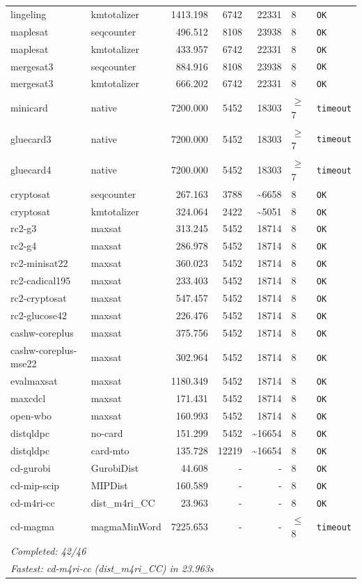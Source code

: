 \begin{longtable}{llrrrl p{}}
lingeling & kmtotalizer & 1413.198 & 6742 & 22331 & 8 & \texttt{OK} \\
maplesat & seqcounter & 496.512 & 8108 & 23938 & 8 & \texttt{OK} \\
maplesat & kmtotalizer & 433.957 & 6742 & 22331 & 8 & \texttt{OK} \\
mergesat3 & seqcounter & 884.916 & 8108 & 23938 & 8 & \texttt{OK} \\
mergesat3 & kmtotalizer & 666.202 & 6742 & 22331 & 8 & \texttt{OK} \\
minicard & native & 7200.000 & 5452 & 18303 & $\geq$7 & \texttt{timeout} \\
gluecard3 & native & 7200.000 & 5452 & 18303 & $\geq$7 & \texttt{timeout} \\
gluecard4 & native & 7200.000 & 5452 & 18303 & $\geq$7 & \texttt{timeout} \\
cryptosat & seqcounter & 267.163 & 3788 & \textasciitilde{}6658 & 8 & \texttt{OK} \\
cryptosat & kmtotalizer & 324.064 & 2422 & \textasciitilde{}5051 & 8 & \texttt{OK} \\
rc2-g3 & maxsat & 313.245 & 5452 & 18714 & 8 & \texttt{OK} \\
rc2-g4 & maxsat & 286.978 & 5452 & 18714 & 8 & \texttt{OK} \\
rc2-minisat22 & maxsat & 360.023 & 5452 & 18714 & 8 & \texttt{OK} \\
rc2-cadical195 & maxsat & 233.403 & 5452 & 18714 & 8 & \texttt{OK} \\
rc2-cryptosat & maxsat & 547.457 & 5452 & 18714 & 8 & \texttt{OK} \\
rc2-glucose42 & maxsat & 226.476 & 5452 & 18714 & 8 & \texttt{OK} \\
cashw-coreplus & maxsat & 375.756 & 5452 & 18714 & 8 & \texttt{OK} \\
cashw-coreplus-mse22 & maxsat & 302.964 & 5452 & 18714 & 8 & \texttt{OK} \\
evalmaxsat & maxsat & 1180.349 & 5452 & 18714 & 8 & \texttt{OK} \\
maxcdcl & maxsat & 171.431 & 5452 & 18714 & 8 & \texttt{OK} \\
open-wbo & maxsat & 160.993 & 5452 & 18714 & 8 & \texttt{OK} \\
distqldpc & no-card & 151.299 & 5452 & \textasciitilde{}16654 & 8 & \texttt{OK} \\
distqldpc & card-mto & 135.728 & 12219 & \textasciitilde{}16654 & 8 & \texttt{OK} \\
cd-gurobi & GurobiDist & 44.608 & - & - & 8 & \texttt{OK} \\
cd-mip-scip & MIPDist & 160.589 & - & - & 8 & \texttt{OK} \\
cd-m4ri-cc & dist\_m4ri\_CC & 23.963 & - & - & 8 & \texttt{OK} \\
cd-magma & magmaMinWord & 7225.653 & - & - & $\leq$8 & \texttt{timeout} \\
\midrule
\multicolumn{7}{l}{\textit{Completed: 42/46}} \\
\multicolumn{7}{l}{\textit{Fastest: cd-m4ri-cc (dist\_m4ri\_CC) in 23.963s}} \\
\end{longtable}
